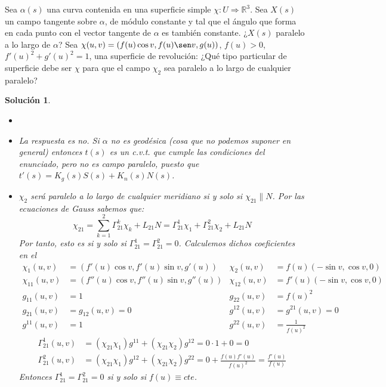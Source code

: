 \documentclass{article}
\theoremstyle{plain}
\newtheorem*{sol*}{Solución}
\newcommand{\R}{\mathbb{R}}
\newcommand{\X}{\chi}
\newenvironment{ejercicio}[2][Estado]{\begin{trivlist}
\item[\hskip \labelsep {\bfseries Ejercicio}\hskip \labelsep {\bfseries #2.}]}{\end{trivlist}}
\begin{document}
\newpage
\begin{ejercicio}{10}
Sea $\alpha(s)$ una curva contenida en una superficie simple $\X : U \Rightarrow \R^3$. Sea $X(s)$ un campo tangente sobre $\alpha$, de módulo constante y tal que el ángulo que forma en cada punto con el vector tangente de $\alpha$ es también constante. ¿$X(s)$ paralelo a lo largo de $\alpha$? Sea $\X(u, v) =( f(u) \cos v, f(u) \sen v, g(u))$, $f(u) > 0$, $f'(u)^2+ g'(u)^2 = 1$, una superficie de revolución: ¿Qué tipo particular de superficie debe ser $\X$ para que el campo $\X_2$ sea paralelo a lo largo de cualquier paralelo?
\end{ejercicio}
\begin{sol*}
\begin{itemize}
\item[]
\item La respuesta es no. Si $\alpha$ no es geodésica (cosa que no podemos suponer en general) entonces $t(s)$ es un c.v.t. que cumple las condiciones del enunciado, pero no es campo paralelo, puesto que $t'(s)=K_g(s)S(s)+K_n(s)N(s)$.
\item $\X_2$ será paralelo a lo largo de cualquier meridiano si y solo si $\X_{21} \parallel N$. Por las ecuaciones de Gauss sabemos que:
\[
\X_{21} = \sum_{k=1}^2 \Gamma_{21}^k \X_k+ L_{21}N = \Gamma_{21}^1\X_1 + \Gamma_{21}^2\X_2 + L_{21}N
\]
Por tanto, esto es si y solo si $\Gamma_{21}^1=\Gamma_{21}^2 = 0$. Calculemos dichos coeficientes en el 
\begin{align*}
\X_1(u,v) & = (f'(u)\cos v, f'(u) \sin v, g'(u)) & \X_2(u,v)& = f(u)(-\sin v, \cos v, 0)\\
\X_{11}(u,v) &=   (f''(u)\cos v, f''(u) \sin v, g''(u))                     & \X_{12}(u,v) & = f'(u)(-\sin v,\cos v, 0)      \\
g_{11}(u,v) & = 1 & g_{22}(u,v) & = f(u)^2\\
g_{21}(u,v) & = g_{12}(u,v)=0  &  g^{12}(u,v)&=g^{21}(u,v) = 0\\
g^{11}(u,v) & = 1 & g^{22}(u,v) & = \frac{1}{f(u)^2}
\end{align*}
\begin{align*}
\Gamma_{21}^1(u,v) &= (\X_{21}\X_1)g^{11} + (\X_{21}\X_2)g^{12} =0\cdot 1 + 0 = 0\\
\Gamma_{21}^2(u,v) &= (\X_{21}\X_1)g^{12} + (\X_{21}\X_2)g^{22} = 0+\frac{f(u)f'(u)}{f(u)^2}= \frac{f'(u)}{f(u)}
\end{align*}
Entonces $\Gamma_{21}^1=\Gamma_{21}^2 = 0$ si y solo si $f(u)\equiv cte$.
\end{itemize}
\end{sol*}
\end{document}

